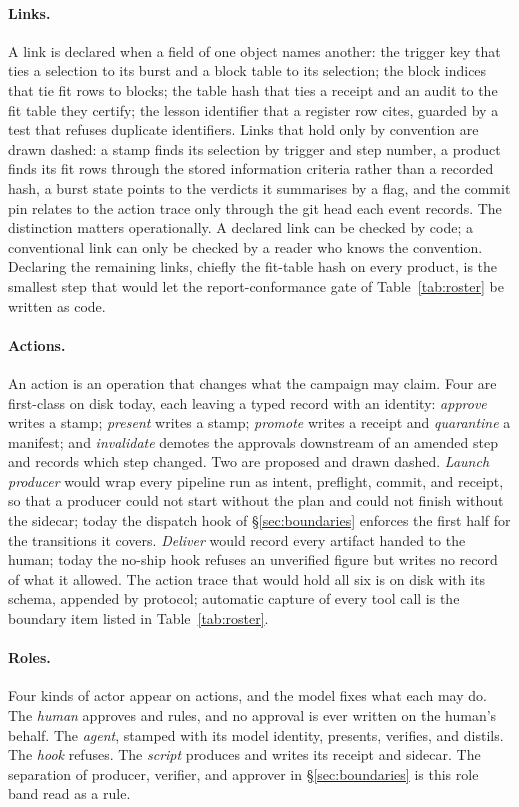 \paragraph{Links.} A link is declared when a field of one object names
another: the trigger key that ties a selection to its burst and a block
table to its selection; the block indices that tie fit rows to blocks; the
table hash that ties a receipt and an audit to the fit table they certify;
the lesson identifier that a register row cites, guarded by a test that
refuses duplicate identifiers. Links that hold only by convention are drawn
dashed: a stamp finds its selection by trigger and step number, a product
finds its fit rows through the stored information criteria rather than a
recorded hash, a burst state points to the verdicts it summarises by a
flag, and the commit pin relates to the action trace only through the git
head each event records. The distinction matters operationally. A declared
link can be checked by code; a conventional link can only be checked by a
reader who knows the convention. Declaring the remaining links, chiefly the
fit-table hash on every product, is the smallest step that would let the
report-conformance gate of Table~\ref{tab:roster} be written as code.

\paragraph{Actions.} An action is an operation that changes what the
campaign may claim. Four are first-class on disk today, each leaving a
typed record with an identity: \emph{approve} writes a stamp; \emph{present}
writes a stamp; \emph{promote} writes a receipt and \emph{quarantine} a manifest; and
\emph{invalidate} demotes the approvals downstream of an amended step and
records which step changed. Two are proposed and drawn dashed. \emph{Launch producer}
would wrap every pipeline run as intent, preflight, commit, and receipt,
so that a producer could not start without the plan and could not finish
without the sidecar; today the dispatch hook of \S\ref{sec:boundaries}
enforces the first half for the transitions it covers. \emph{Deliver} would
record every artifact handed to the human; today the no-ship hook refuses
an unverified figure but writes no record of what it allowed. The action
trace that would hold all six is on disk with its schema, appended by
protocol; automatic capture of every tool call is the boundary item listed
in Table~\ref{tab:roster}.

\paragraph{Roles.} Four kinds of actor appear on actions, and the model
fixes what each may do. The \emph{human} approves and rules, and no
approval is ever written on the human's behalf. The \emph{agent}, stamped
with its model identity, presents, verifies, and distils. The \emph{hook}
refuses. The \emph{script} produces and writes its receipt and sidecar.
The separation of producer, verifier, and approver in
\S\ref{sec:boundaries} is this role band read as a rule.

